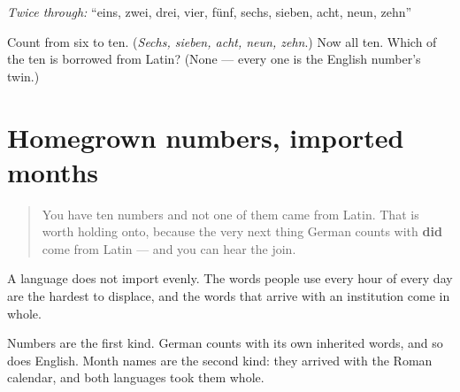 \emph{Twice through:} \textquotedblleft{}eins, zwei, drei, vier, fünf, sechs, sieben, acht, neun, zehn\textquotedblright{}

\begin{tcolorbox}[breakable,colback=teal!4,colframe=teal!35!black,title={Before you move on}]
Count from six to ten. (\emph{Sechs, sieben, acht, neun, zehn}.) Now all ten. Which of the ten is borrowed from Latin? (None — every one is the English number's twin.)
\end{tcolorbox}
\section[(homegrown numbers, imported months)]{Homegrown numbers, imported months}

\label{lesson:GE-C06-monate-latein}



\begin{quote}
You have ten numbers and not one of them came from Latin. That is worth holding onto, because the very next thing German counts with \textbf{did} come from Latin — and you can hear the join.
\end{quote}

\begin{grammarlens}[title={Grammar Lens: a language keeps some words and buys others}]
A language does not import evenly. The words people use every hour of every day are the hardest to displace, and the words that arrive with an institution come in whole.

Numbers are the first kind. German counts with its own inherited words, and so does English. Month names are the second kind: they arrived with the Roman calendar, and both languages took them whole.
\end{grammarlens}

